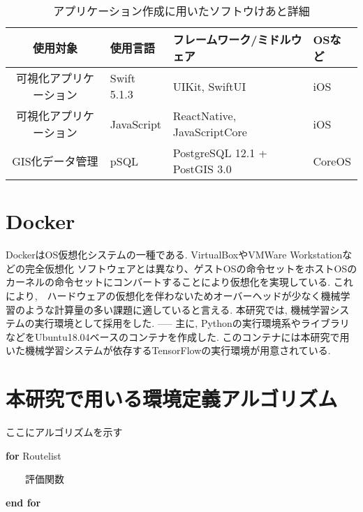 \begin{table}[h]
  \caption{アプリケーション作成に用いたソフトウけあと詳細}
  \label{table:SpeedOfLight}
  \centering
  \begin{tabular}{clll}
    \hline
      使用対象 & 使用言語 & フレームワーク/ミドルウェア & OSなど \\
      \hline \hline
      可視化アプリケーション & Swift 5.1.3 & UIKit, SwiftUI & iOS \\
      可視化アプリケーション & JavaScript & ReactNative, JavaScriptCore & iOS \\
      GIS化データ管理 & pSQL & PostgreSQL 12.1 + PostGIS 3.0 & CoreOS \\
    \hline
  \end{tabular}
\end{table}


\section{Docker}

DockerはOS仮想化システムの一種である. VirtualBoxやVMWare Workstationなどの完全仮想化
ソフトウェアとは異なり、ゲストOSの命令セットをホストOSのカーネルの命令セットにコンバートすることにより仮想化を実現している.
これにより,　ハードウェアの仮想化を伴わないためオーバーヘッドが少なく機械学習のような計算量の多い課題に適していると言える.
本研究では, 機械学習システムの実行環境として採用をした.
-----
主に, Pythonの実行環境系やライブラリなどをUbuntu18.04ベースのコンテナを作成した.
このコンテナには本研究で用いた機械学習システムが依存するTensorFlowの実行環境が用意されている.

\section{本研究で用いる環境定義アルゴリズム}

ここにアルゴリズムを示す

\textbf{for} Routelist

\ \ \ \ 評価関数

\textbf{end for}


